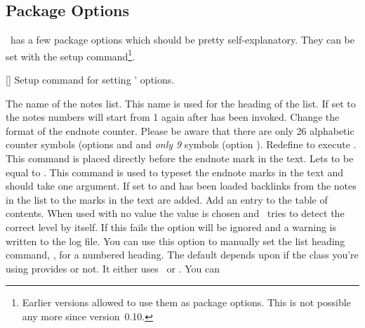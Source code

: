 \documentclass[load-preamble+]{cnltx-doc}
\begin{document}
\subsection{Package Options}
\enotez\ has a few package options which should be pretty self-explanatory.
They can be set with the setup command\footnote{Earlier versions allowed to
  use them as package options. This is not possible any more since
  version~0.10.}.
\begin{commands}
  []
    Setup command for setting \enotez' options.
\end{commands}
\begin{options}
    The name of the notes list. This name is used for the heading of the
    list.
    If set to  the notes numbers will start from 1 again after
     has been invoked.
    Change the format of the endnote counter.  Please be aware that there are
    only 26 alphabetic counter symbols (options  and 
    and \emph{only 9} symbols (option ).
  \Default
    Redefine  to execute .  This command is placed
    directly before the endnote mark in the text.
    Lets  to be equal to .  This command
    is used to typeset the endnote marks in the text and should take one
    argument.
  \label{key:backref}
    If set to  and  has been
    loaded backlinks from the notes in the list to the marks in the text are
    added.
    \label{key:totoc}
    Add an entry to the table of contents.  When used
    with no value the value  is chosen and \enotez\ tries to detect
    the correct level by itself.  If this fails the option will be ignored and
    a warning is written to the log file.
    You can use this option to manually set the list heading command, \eg,
     for a numbered heading.  The
    default depends upon if the class you're using provides  or
    not.  It either uses \sarg\ or \sarg. You can

\end{options}
\end{document}
